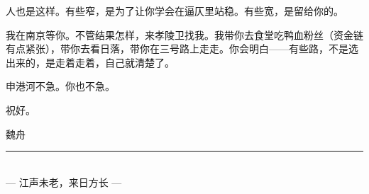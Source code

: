 \documentclass[12pt,a4paper]{article}
\begin{document}
人也是这样。有些窄，是为了让你学会在逼仄里站稳。有些宽，是留给你的。\par

我在南京等你。不管结果怎样，来孝陵卫找我。我带你去食堂吃鸭血粉丝（资金链有点紧张），带你去看日落，带你在三号路上走走。你会明白——有些路，不是选出来的，是走着走着，自己就清楚了。\par

申港河不急。你也不急。\par

祝好。

\vspace{1.6em}
\begin{flushright}
  {\heiti 魏舟}\\[0.5em]
\end{flushright}

\vspace{2.5em}
\begin{center}
  \textcolor{softgold}{\rule{0.6\textwidth}{0.6pt}}\\[0.3em]
  {\footnotesize\color{gray} — 江声未老，来日方长 —}
\end{center}
\end{document}
